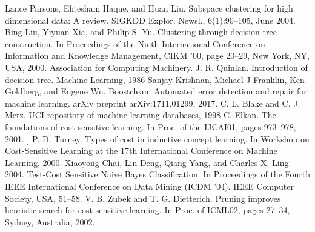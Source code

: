 \documentclass[conference]{IEEEtran}
\begin{document}
\begin{thebibliography}{00}
  Lance Parsons, Ehtesham Haque, and Huan Liu. Subspace clustering for high dimensional
data: A review. SIGKDD Explor. Newsl., 6(1):90–105, June 2004.
 Bing Liu, Yiyuan Xia, and Philip S. Yu. Clustering through decision tree construction. In Proceedings of the Ninth International Conference on Information and Knowledge Management,
CIKM ’00, page 20–29, New York, NY, USA, 2000. Association for Computing Machinery.
  J. R. Quinlan. Introduction of decision tree. Machine Learning, 1986
 Sanjay Krishnan, Michael J Franklin, Ken Goldberg, and Eugene Wu. Boostclean: Automated
error detection and repair for machine learning. arXiv preprint arXiv:1711.01299, 2017.
C. L. Blake and C. J. Merz. UCI repository of machine learning databases, 1998
 C. Elkan. The foundations of cost-sensitive learning. In
Proc. of the IJCAI01, pages 973–978, 2001.
 ] P. D. Turney. Types of cost in inductive concept learning.
In Workshop on Cost-Sensitive Learning at the 17th International Conference on Machine Learning, 2000.
 Xiaoyong Chai, Lin Deng, Qiang Yang, and Charles X. Ling. 2004. Test-Cost Sensitive Naive Bayes Classification. In Proceedings of the Fourth IEEE International Conference on Data Mining (ICDM ’04). IEEE Computer Society, USA, 51–58.
 V. B. Zubek and T. G. Dietterich. Pruning improves heuristic
search for cost-sensitive learning. In Proc. of ICML02, pages
27–34, Sydney, Australia, 2002.
\end{thebibliography}
\end{document}
